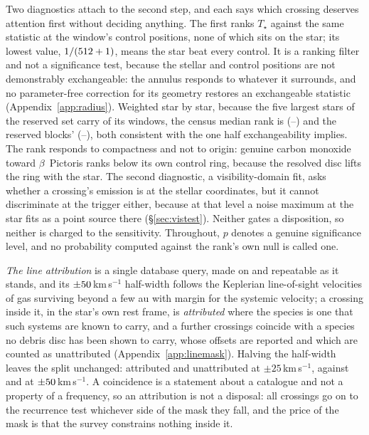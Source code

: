 Two diagnostics attach to the second step, and each says which crossing
deserves attention first without deciding anything. The first ranks $T_\star$
against the same statistic at the window's \NCtrl{} control positions, none of
which sits on the star; its lowest value, $1/(512+1)$, means the star beat
every control. It is a ranking filter and not a significance test, because the
stellar and control positions are not demonstrably exchangeable: the annulus
responds to whatever it surrounds, and no parameter-free correction for its
geometry restores an exchangeable statistic (Appendix~\ref{app:radius}).
Weighted star by star, because the five largest stars of the reserved set
carry \BkRankTopFiveWin{} of its \HoWin{} windows, the census median rank is
\BkRankBalSurv{} (\BkRankBalSurvLo--\BkRankBalSurvHi) and the reserved
blocks' \BkRankBalHo{} (\BkRankBalHoLo--\BkRankBalHoHi), both consistent with
the one half exchangeability implies. The rank responds to compactness and
not to origin: genuine carbon monoxide toward $\beta$~Pictoris ranks below its
own control ring, because the resolved disc lifts the ring with the star. The
second diagnostic, a visibility-domain fit, asks whether a crossing's emission
is at the stellar coordinates, but it cannot discriminate at the trigger
either, because at that level a noise maximum at the star fits as a point
source there (\S\ref{sec:vistest}). Neither gates a disposition, so neither is
charged to the sensitivity. Throughout, $p$ denotes a genuine significance
level, and no probability computed against the rank's own null is called one.

\emph{The line attribution} is a single database query, made on \MkListDate{}
and repeatable as it stands, and its $\pm50$\,km\,s$^{-1}$
half-width follows the Keplerian line-of-sight velocities of gas surviving
beyond a few au with margin for the systemic velocity; a crossing inside it,
in the star's own rest frame, is \emph{attributed} where the species is one
that such systems are known to carry, and a further \SoNCrossWord{} crossings
coincide with a species no debris disc has been shown to carry, whose offsets
are reported and which are counted as unattributed
(Appendix~\ref{app:linemask}). Halving the half-width leaves the split unchanged:
\FrAttrWTwentyFive{} attributed and \FrUnattrWTwentyFive{} unattributed at
$\pm25$\,km\,s$^{-1}$, against \FrAttrWFifty{} and \FrUnattrWFifty{} at
$\pm50$\,km\,s$^{-1}$. A coincidence is a statement about a catalogue and not a
property of a frequency, so an attribution is not a disposal: all \CnCross{}
crossings go on to the recurrence test whichever side of the mask they fall,
and the price of the mask is that the survey constrains nothing inside it.

